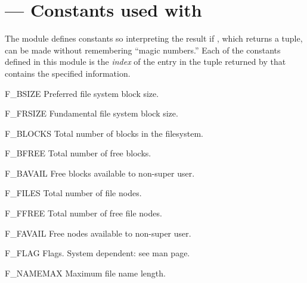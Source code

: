 \section{ ---
         Constants used with }


The  module defines constants so interpreting the result
if , which returns a tuple, can be made without
remembering ``magic numbers.''  Each of the constants defined in this
module is the \emph{index} of the entry in the tuple returned by
 that contains the specified information.


\begin{datadesc}{F_BSIZE}
Preferred file system block size.
\end{datadesc}

\begin{datadesc}{F_FRSIZE}
Fundamental file system block size.
\end{datadesc}

\begin{datadesc}{F_BLOCKS}
Total number of blocks in the filesystem.
\end{datadesc}

\begin{datadesc}{F_BFREE}
Total number of free blocks.
\end{datadesc}

\begin{datadesc}{F_BAVAIL}
Free blocks available to non-super user.
\end{datadesc}

\begin{datadesc}{F_FILES}
Total number of file nodes.
\end{datadesc}

\begin{datadesc}{F_FFREE}
Total number of free file nodes.
\end{datadesc}

\begin{datadesc}{F_FAVAIL}
Free nodes available to non-super user.
\end{datadesc}

\begin{datadesc}{F_FLAG}
Flags. System dependent: see  man page.
\end{datadesc}

\begin{datadesc}{F_NAMEMAX}
Maximum file name length.
\end{datadesc}
